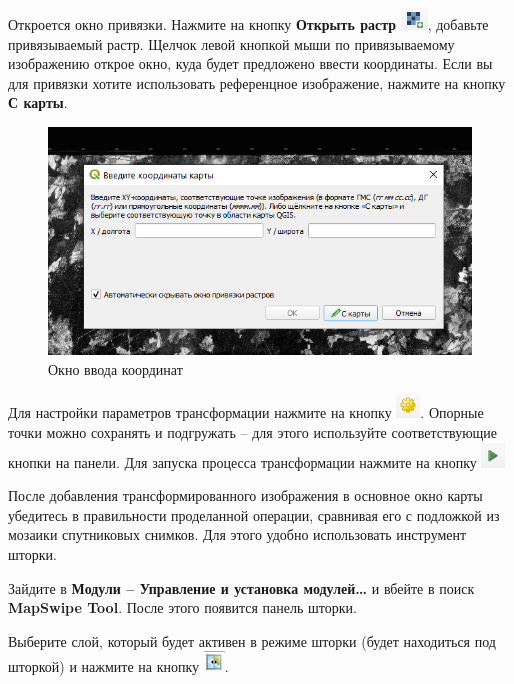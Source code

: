 \documentclass[
  12pt,
]{book}
\begin{document}
Откроется окно привязки. Нажмите на кнопку \textbf{Открыть растр} \includegraphics{images/Ref02/Open_rastr.png}, добавьте привязываемый растр. Щелчок левой кнопкой мыши по привязываемому изображению открое окно, куда будет предложено ввести координаты. Если вы для привязки хотите использовать референцное изображение, нажмите на кнопку \textbf{С карты}.

\begin{figure}
\centering
\includegraphics{images/Ref02/Input_coordinates.png}
\caption{Окно ввода координат}
\end{figure}

Для настройки параметров трансформации нажмите на кнопку \includegraphics{images/Ref02/Transformation_settings.png}. Опорные точки можно сохранять и подгружать -- для этого используйте соответствующие кнопки на панели. Для запуска процесса трансформации нажмите на кнопку \includegraphics{images/Ref02/Transformation_button.png}

После добавления трансформированного изображения в основное окно карты убедитесь в правильности проделанной операции, сравнивая его с подложкой из мозаики спутниковых снимков. Для этого удобно использовать инструмент шторки.

Зайдите в \textbf{Модули -- Управление и установка модулей\ldots{}} и вбейте в поиск \textbf{MapSwipe Tool}. После этого появится панель шторки.

Выберите слой, который будет активен в режиме шторки (будет находиться под шторкой) и нажмите на кнопку \includegraphics{images/Ref02/Swipe_button.png}.
\end{document}
